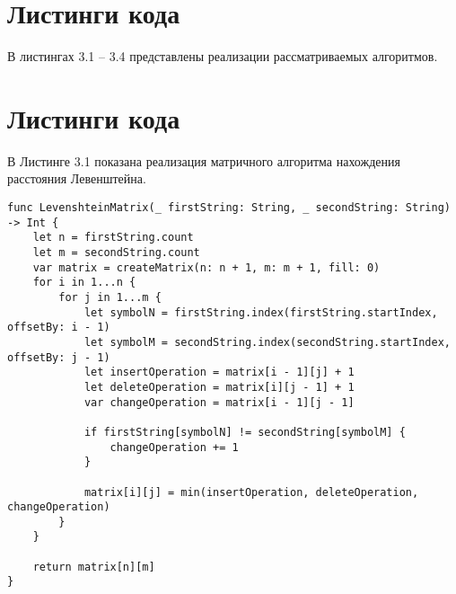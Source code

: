 \section{Листинги кода}

В листингах 3.1 -- 3.4 представлены реализации рассматриваемых алгоритмов.

\section{Листинги кода}


\hspace{0.6cm}В Листинге 3.1 показана реализация матричного алгоритма нахождения расстояния Левенштейна.
\begin{lstlisting}[caption=Функция нахождения расстояния Левенштейна матрично]
func LevenshteinMatrix(_ firstString: String, _ secondString: String) -> Int {
    let n = firstString.count
    let m = secondString.count  
    var matrix = createMatrix(n: n + 1, m: m + 1, fill: 0)
    for i in 1...n {
        for j in 1...m {
            let symbolN = firstString.index(firstString.startIndex, offsetBy: i - 1)
            let symbolM = secondString.index(secondString.startIndex, offsetBy: j - 1)
            let insertOperation = matrix[i - 1][j] + 1
            let deleteOperation = matrix[i][j - 1] + 1
            var changeOperation = matrix[i - 1][j - 1]
            
            if firstString[symbolN] != secondString[symbolM] {
                changeOperation += 1
            }
            
            matrix[i][j] = min(insertOperation, deleteOperation, changeOperation)
        }
    }
    
    return matrix[n][m]
}
\end{lstlisting}


